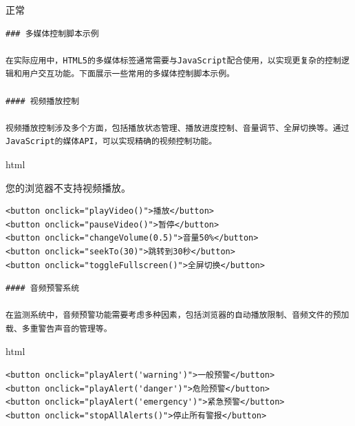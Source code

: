 正常

\begin{lstlisting}
### 多媒体控制脚本示例

在实际应用中，HTML5的多媒体标签通常需要与JavaScript配合使用，以实现更复杂的控制逻辑和用户交互功能。下面展示一些常用的多媒体控制脚本示例。

#### 视频播放控制

视频播放控制涉及多个方面，包括播放状态管理、播放进度控制、音量调节、全屏切换等。通过JavaScript的媒体API，可以实现精确的视频控制功能。

\end{lstlisting}

html

您的浏览器不支持视频播放。

\begin{verbatim}
<button onclick="playVideo()">播放</button>
<button onclick="pauseVideo()">暂停</button>
<button onclick="changeVolume(0.5)">音量50%</button>
<button onclick="seekTo(30)">跳转到30秒</button>
<button onclick="toggleFullscreen()">全屏切换</button>
\end{verbatim}

\begin{lstlisting}
#### 音频预警系统

在监测系统中，音频预警功能需要考虑多种因素，包括浏览器的自动播放限制、音频文件的预加载、多重警告声音的管理等。

\end{lstlisting}

html

\begin{verbatim}
<button onclick="playAlert('warning')">一般预警</button>
<button onclick="playAlert('danger')">危险预警</button>
<button onclick="playAlert('emergency')">紧急预警</button>
<button onclick="stopAllAlerts()">停止所有警报</button>
\end{verbatim}


